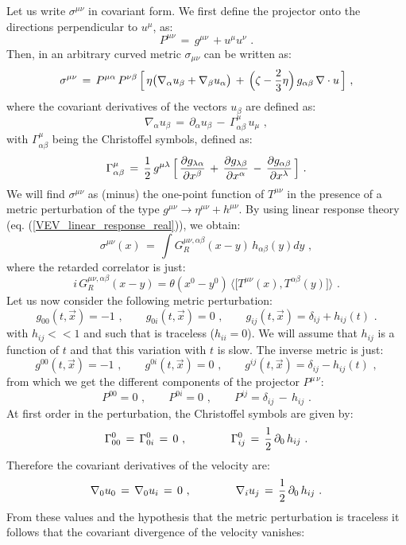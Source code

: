 \documentclass[12pt,notitlepage]{article}
\newcommand{\beq}{\begin{equation}}
\newcommand{\eeq}{\end{equation}}
\begin{document}
Let us write $\sigma^{\mu\nu}$ in covariant form. We first define the projector onto the directions perpendicular to $u^{\mu}$, as:
\beq
P^{\mu\nu}\,=\,g^{\mu\nu}\,+u^{\mu} u^{\nu}\,\,.
\eeq
Then, in an arbitrary curved metric $\sigma_{\mu\nu}$ can be written as:
\beq
\sigma^{\mu\nu}\,=\,P^{\mu\alpha}\,P^{\nu\beta}\,\Big[\,
\eta \big(\nabla_{\alpha} u_{\beta}+\nabla_{\beta}u_{\alpha}\big)\,+\,
\Big(\zeta-{2\over 3}\eta\Big)\,g_{\alpha\beta}\,\nabla\cdot u\,\Big]\,\,,
\eeq
where the covariant derivatives  of the vectors $u_{\beta}$ are defined as:
\beq
\nabla_{\alpha} u_{\beta}\,=\,\partial_{\alpha} u_{\beta}\,-\,
\Gamma_{\alpha\beta}^{\mu}\,u_{\mu}\,\,,
\eeq
with $\Gamma_{\alpha\beta}^{\mu}$ being the Christoffel symbols, defined as:
\beq
\Gamma_{\alpha\beta}^{\mu}\,=\,{1\over 2}\,g^{\mu\lambda}\,
\Big[\,{\partial g_{\lambda\alpha}\over \partial x^{\beta}}\,+\,
{\partial g_{\lambda\beta}\over \partial x^{\alpha}}\,-\,
{\partial g_{\alpha\beta}\over \partial x^{\lambda}}\,\Big]\,\,.
\eeq
We will find $\sigma^{\mu\nu}$ as  (minus) the one-point function of $T^{\mu\nu}$ in the presence of a metric perturbation of the type $g^{\mu\nu}\to \eta^{\mu\nu}+h^{\mu\nu}$. By using linear response theory (eq.  (\ref{VEV_linear_response_real})),  we obtain:
\beq
\sigma^{\mu\nu}(x)\,=\,\int G_{R}^{\mu\nu, \alpha\beta} (x-y)\,h_{\alpha\beta} (y) dy\,\,,
\eeq
where the retarded correlator is just:
\beq
i\,G_{R}^{\mu\nu, \alpha\beta} (x-y)=\theta(x^0-y^0)\,
\langle \big[T^{\mu\nu}(x), T^{\alpha\beta}(y)\big]\rangle\,\,.
\eeq
Let us now  consider the following metric perturbation:
\beq
g_{00}(t,\vec x)=-1\,\,,
\qquad
g_{0i}(t,\vec x)=0\,\,,
\qquad
g_{ij}(t,\vec x)=\delta_{ij}+h_{ij}(t)\,\,.
\eeq
with $h_{ij}<<1$ and such that is traceless ($h_{ii}=0$). We will assume that 
$h_{ij}$ is a function of $t$ and that this variation with $t$ is slow.
The inverse metric is just:
\beq
g^{00}(t,\vec x)=-1\,\,,
\qquad
g^{0i}(t,\vec x)=0\,\,,
\qquad
g^{ij}(t,\vec x)=\delta_{ij}-h_{ij}(t)\,\,,
\eeq
from which we get the different components of the projector $P^{\mu\,\nu}$:
\beq
P^{00}=0\,\,,
\qquad
P^{0i}=0\,\,,
\qquad
P^{ij}=\delta_{ij}\,-\,h_{ij}\,\,.
\eeq
At first order in the perturbation, the Christoffel symbols are given by:
\beq
\Gamma_{00}^{0}\,=\,\Gamma_{0i}^{0}\,=\,0\,\,,
\qquad\qquad
\Gamma_{ij}^{0}\,=\,{1\over 2}\,\partial_{0}\, h_{ij}\,\,.
\eeq
Therefore the covariant derivatives of the velocity are:
\beq
\nabla_{0} u_{0}\,=\,\nabla_{0} u_{i}\,=\,0\,\,,
\qquad\qquad
\nabla_{i} u_{j}\,=\,{1\over 2}\,\partial_{0}\, h_{ij}\,\,.
\eeq
From these values and the hypothesis that the metric perturbation is traceless it follows that the covariant divergence of the velocity vanishes:
\end{document}
